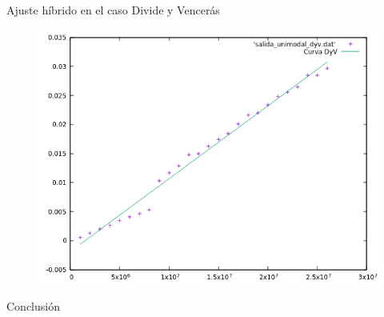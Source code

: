 \documentclass[12pt]{beamer}
\begin{document}
\begin{frame}{Ajuste híbrido en el caso Divide y Vencerás}

\begin{figure}[H] 
\centering
\includegraphics[angle=0,scale=0.5]{img/AjusteHibridoDyV.png} 
\label{etiqueta} 
\end{figure}

\end{frame}

\begin{frame}{Conclusión}

\end{frame}
\end{document}
